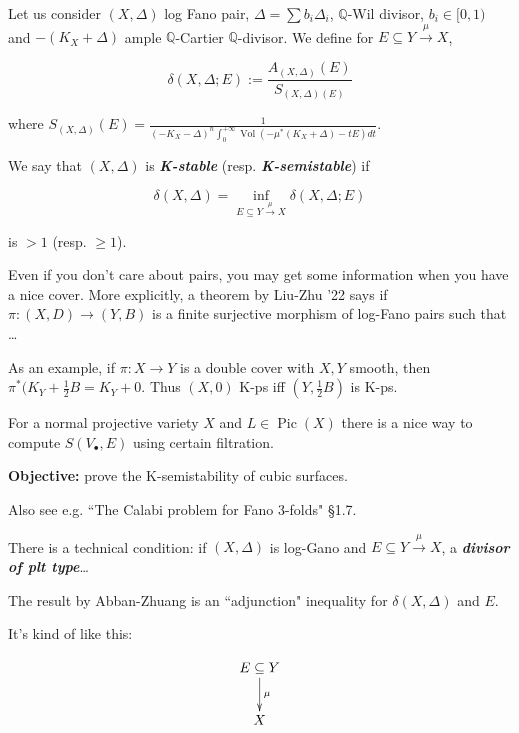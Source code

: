 Let us consider $(X,\Delta)$ log Fano pair,
$\Delta=\sum b_i\Delta_i$, $\mathbb{Q}$-Wil
divisor, $b_i \in [0,1)$ and $-(K_X+\Delta)$
ample $\mathbb{Q}$-Cartier
$\mathbb{Q}$-divisor. We define for $E
\subseteq Y \xrightarrow{\mu}X$,

$$
\delta(X,\Delta;E):=\frac{A_{(X,
\Delta)}(E)}{S_{(X,\Delta)(E)}}
$$

where
$S_{(X,\Delta)}(E)=\frac{1}{(-K_X-\Delta)^n
\int_0^{+\infty}\operatorname{Vol}(-\mu
^*(K_X+\Delta)-tE)dt}$.

We say that $(X,\Delta)$ is
\textit{\textbf{K-stable}} (resp.
\textit{\textbf{K-semistable}}) if

$$
\delta(X,\Delta)=\operatorname{inf}_{E
\subseteq Y
\xrightarrow{\mu}X}\delta(X,\Delta;E)
$$

is $>1$ (resp. $\geq 1$).

\begin{remark}
\label{remark-montero-7}
Even if you don't care about pairs, you may
get some information when you have a nice
cover. More explicitly, a theorem by Liu-Zhu
'22 says if $\pi:(X,D)\to (Y,B)$ is a finite
surjective morphism of log-Fano pairs such
that \ldots{}

As an example, if $\pi:X \to Y$ is a double
cover with $X,Y$ smooth, then $\pi^*
(K_Y+\frac{1}{2}B=K_Y+0$. Thus $(X,0)$ K-ps
iff $(Y,\frac{1}{2}B)$ is K-ps.
\end{remark}

\begin{remark}
\label{remark-montero-8}
For a normal projective variety $X$ and $L
\in \operatorname{Pic}(X)$ there is a nice
way to compute $S(V_\bullet,E)$ using certain
filtration.
\end{remark}

\medskip{}

\textbf{Objective:} prove the K-semistability
of cubic surfaces.

Also see e.g. ``The Calabi problem for Fano
3-folds" \S{}1.7.

There is a technical condition: if
$(X,\Delta)$ is log-Gano and $E \subseteq Y
\xrightarrow{\mu}X$, a
\textit{\textbf{divisor of plt type}}\ldots{}

The result by Abban-Zhuang is an
``adjunction" inequality for
$\delta(X,\Delta)$ and $E$.

It's kind of like this:

$$
\xymatrix{E\subseteq Y\ar[d]^{\mu}\\ X}
$$

